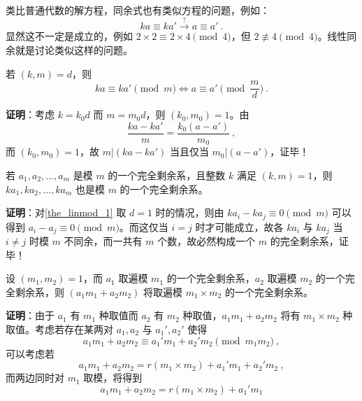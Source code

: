 

类比普通代数的解方程，同余式也有类似方程的问题，例如：
\begin{equation}
ka \equiv ka' \xrightarrow{?} a \equiv a'  ~.
\end{equation}
显然这不一定是成立的，例如 $2 \times 2 \equiv 2 \times 4 \pmod 4$，但 $2 \not \equiv 4 \pmod 4$。线性同余就是讨论类似这样的问题。

\begin{theorem}{}\label{the_linmod_1}
若 $(k, m) = d$，则
\begin{equation}
ka \equiv ka' \pmod m \Leftrightarrow a \equiv a' \pmod{\frac{m}{d}} ~.
\end{equation}
\end{theorem}
\textbf{证明}：考虑 $k = k_0 d$ 而 $m = m_0 d$，则 $(k_0, m_0) = 1$。由
\begin{equation}
\frac{ka - ka'}{m} = \frac{k_0(a - a')}{m_0} ~,
\end{equation}
而 $(k_0, m_0) = 1$，故 $m | (k a - k a')$ 当且仅当 $m_0 | (a - a')$，证毕！

\begin{theorem}{}\label{the_linmod_2}
若 $a_1, a_2, \dots, a_m$ 是模 $m$ 的一个完全剩余系，且整数 $k$ 满足 $(k, m) =1$，则 $ka_1, ka_2, \dots, ka_m$ 也是模 $m$ 的一个完全剩余系。
\end{theorem}
\textbf{证明}：对\autoref{the_linmod_1} 取 $d=1$ 时的情况，则由 $ka_i - ka_j \equiv 0 \pmod m$ 可以得到 $a_i - a_j \equiv 0 \pmod m$。而这仅当 $i = j$ 时才可能成立，故各 $ka_i$ 与 $ka_j$ 当 $i \neq j$ 时模 $m$ 不同余，而一共有 $m$ 个数，故必然构成一个 $m$ 的完全剩余系，证毕！

\begin{theorem}{}
设 $(m_1, m_2) = 1$，而 $a_1$ 取遍模 $m_1$ 的一个完全剩余系，$a_2$ 取遍模 $m_2$ 的一个完全剩余系，则 $(a_1 m_1 + a_2 m_2)$ 将取遍模 $m_1 \times m_2$ 的一个完全剩余系。
\end{theorem}
\textbf{证明}：由于 $a_1$ 有 $m_1$ 种取值而 $a_2$ 有 $m_2$ 种取值，$a_1m_1+a_2m_2$ 将有 $m_1 \times m_2$ 种取值。考虑若存在某两对 $a_1, a_2$ 与 $a_1', a_2'$ 使得
\begin{equation}
a_1 m_1 + a_2 m_2 \equiv a_1' m_1 + a_2' m_2 \pmod{m_1 m_2} ~,
\end{equation}
可以考虑若
\begin{equation}
a_1 m_1 + a_2 m_2= r(m_1 \times m_2) + a_1' m_1 + a_2' m_2 ~,
\end{equation}
而两边同时对 $m_1$ 取模，将得到
\begin{equation}
a_1 m_1 + a_2 m_2 = r(m_1 \times m_2) + a_1' m_1 
\end{equation}


